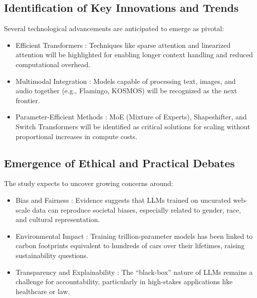 \documentclass[conference]{IEEEtran}
\begin{document}
\subsection{Identification of Key Innovations and Trends}
Several technological advancements are anticipated to emerge as pivotal:
\begin{itemize}
    \item Efficient Transformers : Techniques like sparse attention and linearized attention will be highlighted for enabling longer context handling and reduced computational overhead.\cite{vaswani2017}
    \item Multimodal Integration : Models capable of processing text, images, and audio together (e.g., Flamingo, KOSMOS) will be recognized as the next frontier. \cite{tan2019lxmert}
    \item Parameter-Efficient Methods : MoE (Mixture of Experts), Shapeshifter, and Switch Transformers will be identified as critical solutions for scaling without proportional increases in compute costs.\cite{DBLP:journals/neco/JacobsHJordan91}
\end{itemize}

\subsection{Emergence of Ethical and Practical Debates}
The study expects to uncover growing concerns around:
\begin{itemize}
    \item Bias and Fairness : Evidence suggests that LLMs trained on uncurated web-scale data can reproduce societal biases, especially related to gender, race, and cultural representation. \cite{bommasani2021}
    \item Environmental Impact : Training trillion-parameter models has been linked to carbon footprints equivalent to hundreds of cars over their lifetimes, raising sustainability questions. \cite{strubell2019}
    \item Transparency and Explainability : The “black-box” nature of LLMs remains a challenge for accountability, particularly in high-stakes applications like healthcare or law.\cite{mehrabi2021}
\end{itemize}
\end{document}
